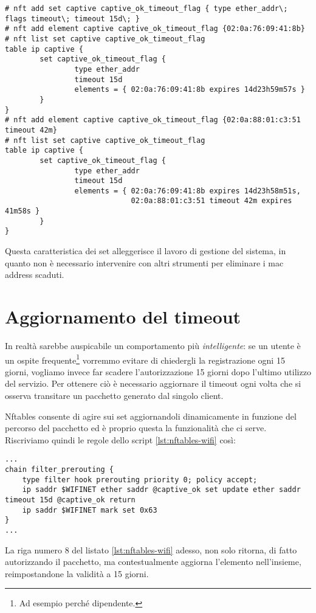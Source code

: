 \begin{lstlisting}
# nft add set captive captive_ok_timeout_flag { type ether_addr\; flags timeout\; timeout 15d\; }
# nft add element captive captive_ok_timeout_flag {02:0a:76:09:41:8b}
# nft list set captive captive_ok_timeout_flag
table ip captive {
        set captive_ok_timeout_flag {
                type ether_addr
                timeout 15d
                elements = { 02:0a:76:09:41:8b expires 14d23h59m57s }
        }
}
# nft add element captive captive_ok_timeout_flag {02:0a:88:01:c3:51 timeout 42m}
# nft list set captive captive_ok_timeout_flag
table ip captive {
        set captive_ok_timeout_flag {
                type ether_addr
                timeout 15d
                elements = { 02:0a:76:09:41:8b expires 14d23h58m51s,
                             02:0a:88:01:c3:51 timeout 42m expires 41m58s }
        }
}
\end{lstlisting}
Questa caratteristica dei set alleggerisce il lavoro di gestione del sistema, in quanto non è necessario intervenire con altri
strumenti per eliminare i mac address scaduti.
\section{Aggiornamento del timeout}
In realt\`a sarebbe auspicabile un comportamento pi\`u {\em intelligente}: se un utente \`e 
un ospite frequente\footnote{Ad esempio perch\'e dipendente.} vorremmo evitare
di chiedergli la registrazione ogni 15 giorni,
vogliamo invece far scadere l'autorizzazione 15 giorni dopo l'ultimo utilizzo del servizio.
Per ottenere ci\`o \`e necessario aggiornare il timeout
ogni volta che si osserva transitare un pacchetto generato dal singolo client.

Nftables consente di agire sui set aggiornandoli dinamicamente in funzione del
percorso del pacchetto ed \`e proprio questa la funzionalit\`a che ci serve.
Riscriviamo quindi le regole dello script \ref{lst:nftables-wifi} cos\`i:

\begin{lstlisting}[style=customc,firstnumber=5]
...
chain filter_prerouting {
    type filter hook prerouting priority 0; policy accept;
    ip saddr $WIFINET ether saddr @captive_ok set update ether saddr timeout 15d @captive_ok return
    ip saddr $WIFINET mark set 0x63
}
...
\end{lstlisting}
La riga numero 8 del listato \ref{lst:nftables-wifi} adesso, non solo ritorna,
di fatto autorizzando il pacchetto, ma contestualmente aggiorna l'elemento
nell'insieme, reimpostandone la validit\`a a 15 giorni.

